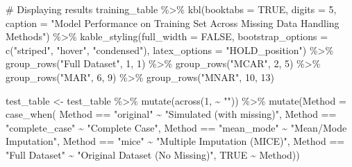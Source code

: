 \documentclass[
  letterpaper,
  DIV=11,
  numbers=noendperiod]{scrartcl}
\newenvironment{Shaded}{\begin{snugshade}}{\end{snugshade}}
\newcommand{\AttributeTok}[1]{\textcolor[rgb]{0.40,0.45,0.13}{#1}}
\newcommand{\CommentTok}[1]{\textcolor[rgb]{0.37,0.37,0.37}{#1}}
\newcommand{\ConstantTok}[1]{\textcolor[rgb]{0.56,0.35,0.01}{#1}}
\newcommand{\DecValTok}[1]{\textcolor[rgb]{0.68,0.00,0.00}{#1}}
\newcommand{\FunctionTok}[1]{\textcolor[rgb]{0.28,0.35,0.67}{#1}}
\newcommand{\NormalTok}[1]{\textcolor[rgb]{0.00,0.23,0.31}{#1}}
\newcommand{\OtherTok}[1]{\textcolor[rgb]{0.00,0.23,0.31}{#1}}
\newcommand{\SpecialCharTok}[1]{\textcolor[rgb]{0.37,0.37,0.37}{#1}}
\newcommand{\StringTok}[1]{\textcolor[rgb]{0.13,0.47,0.30}{#1}}
\begin{document}
\begin{Shaded}
\begin{Highlighting}[]
\CommentTok{\# Displaying results}
\NormalTok{training\_table }\SpecialCharTok{\%\textgreater{}\%}
  \FunctionTok{kbl}\NormalTok{(}\AttributeTok{booktabs =} \ConstantTok{TRUE}\NormalTok{, }\AttributeTok{digits =} \DecValTok{5}\NormalTok{, }\AttributeTok{caption =} \StringTok{"Model Performance on Training Set Across Missing Data Handling Methods"}\NormalTok{) }\SpecialCharTok{\%\textgreater{}\%}
  \FunctionTok{kable\_styling}\NormalTok{(}\AttributeTok{full\_width =} \ConstantTok{FALSE}\NormalTok{, }\AttributeTok{bootstrap\_options =} \FunctionTok{c}\NormalTok{(}\StringTok{"striped"}\NormalTok{, }\StringTok{"hover"}\NormalTok{, }\StringTok{"condensed"}\NormalTok{), }\AttributeTok{latex\_options =} \StringTok{"HOLD\_position"}\NormalTok{) }\SpecialCharTok{\%\textgreater{}\%}
  \FunctionTok{group\_rows}\NormalTok{(}\StringTok{"Full Dataset"}\NormalTok{, }\DecValTok{1}\NormalTok{, }\DecValTok{1}\NormalTok{) }\SpecialCharTok{\%\textgreater{}\%}
  \FunctionTok{group\_rows}\NormalTok{(}\StringTok{"MCAR"}\NormalTok{, }\DecValTok{2}\NormalTok{, }\DecValTok{5}\NormalTok{) }\SpecialCharTok{\%\textgreater{}\%}
  \FunctionTok{group\_rows}\NormalTok{(}\StringTok{"MAR"}\NormalTok{, }\DecValTok{6}\NormalTok{, }\DecValTok{9}\NormalTok{) }\SpecialCharTok{\%\textgreater{}\%}
  \FunctionTok{group\_rows}\NormalTok{(}\StringTok{"MNAR"}\NormalTok{, }\DecValTok{10}\NormalTok{, }\DecValTok{13}\NormalTok{)}

\NormalTok{test\_table }\OtherTok{\textless{}{-}}\NormalTok{ test\_table }\SpecialCharTok{\%\textgreater{}\%}
  \FunctionTok{mutate}\NormalTok{(}\FunctionTok{across}\NormalTok{(}\DecValTok{1}\NormalTok{, }\SpecialCharTok{\textasciitilde{}} \StringTok{""}\NormalTok{)) }\SpecialCharTok{\%\textgreater{}\%}
  \FunctionTok{mutate}\NormalTok{(}\AttributeTok{Method =} \FunctionTok{case\_when}\NormalTok{(}
\NormalTok{      Method }\SpecialCharTok{==} \StringTok{"original"} \SpecialCharTok{\textasciitilde{}} \StringTok{"Simulated (with missing)"}\NormalTok{,}
\NormalTok{      Method }\SpecialCharTok{==} \StringTok{"complete\_case"} \SpecialCharTok{\textasciitilde{}} \StringTok{"Complete Case"}\NormalTok{,}
\NormalTok{      Method }\SpecialCharTok{==} \StringTok{"mean\_mode"} \SpecialCharTok{\textasciitilde{}} \StringTok{"Mean/Mode Imputation"}\NormalTok{,}
\NormalTok{      Method }\SpecialCharTok{==} \StringTok{"mice"} \SpecialCharTok{\textasciitilde{}} \StringTok{"Multiple Imputation (MICE)"}\NormalTok{,}
\NormalTok{      Method }\SpecialCharTok{==} \StringTok{"Full Dataset"} \SpecialCharTok{\textasciitilde{}} \StringTok{"Original Dataset (No Missing)"}\NormalTok{,}
      \ConstantTok{TRUE} \SpecialCharTok{\textasciitilde{}}\NormalTok{ Method))}


\end{Highlighting}
\end{Shaded}
\end{document}
